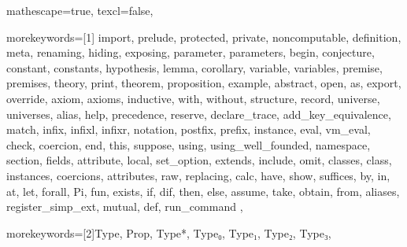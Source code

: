 
 {

mathescape=true,
texcl=false,

morekeywords=[1]{
import, prelude, protected, private, noncomputable, definition, meta, renaming,
hiding, exposing, parameter, parameters, begin, conjecture, constant, constants,
hypothesis, lemma, corollary, variable, variables, premise, premises, theory,
print, theorem, proposition, example, abstract,
open, as, export, override, axiom, axioms, inductive, with, without,
structure, record, universe, universes,
alias, help, precedence, reserve, declare_trace, add_key_equivalence,
match, infix, infixl, infixr, notation, postfix, prefix, instance,
eval, vm_eval, check, coercion, end, this, suppose,
using, using_well_founded, namespace, section, fields,
attribute, local, set_option, extends, include, omit, classes, class,
instances, coercions, attributes, raw, replacing,
calc, have, show, suffices, by, in, at, let, forall, Pi, fun,
exists, if, dif, then, else, assume, take, obtain, from, aliases, register_simp_ext,
mutual, def, run_command
},

morekeywords=[2]{Type, Prop, Type*, Type₀, Type₁, Type₂, Type₃},



}
